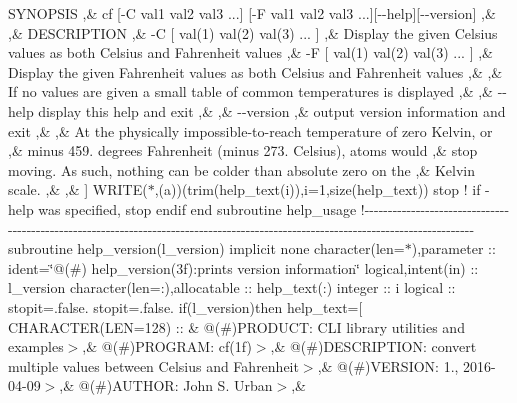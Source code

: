 \begin{DoxyCompactItemize}
\textquotesingle{}\+S\+Y\+N\+O\+P\+S\+I\+S \textquotesingle{},\& \textquotesingle{} cf \mbox{[}-\/\+C val1 val2 val3 ...\mbox{]} \mbox{[}-\/\+F val1 val2 val3 ...\mbox{]}\mbox{[}-\/-\/help\mbox{]}\mbox{[}-\/-\/version\mbox{]} \textquotesingle{},\& \textquotesingle{} \textquotesingle{},\& \textquotesingle{}\+D\+E\+S\+C\+R\+I\+P\+T\+I\+O\+N \textquotesingle{},\& \textquotesingle{} -\/\+C \mbox{[} val(1) val(2) val(3) ... \mbox{]} \textquotesingle{},\& \textquotesingle{} Display the given Celsius values as both Celsius and Fahrenheit values \textquotesingle{},\& \textquotesingle{} -\/\+F \mbox{[} val(1) val(2) val(3) ... \mbox{]} \textquotesingle{},\& \textquotesingle{} Display the given Fahrenheit values as both Celsius and Fahrenheit values \textquotesingle{},\& \textquotesingle{} \textquotesingle{},\& \textquotesingle{} If no values are given a small table of common temperatures is displayed \textquotesingle{},\& \textquotesingle{} \textquotesingle{},\& \textquotesingle{} -\/-\/help display this help and exit \textquotesingle{},\& \textquotesingle{} \textquotesingle{},\& \textquotesingle{} -\/-\/version \textquotesingle{},\& \textquotesingle{} output version information and exit \textquotesingle{},\& \textquotesingle{} \textquotesingle{},\& \textquotesingle{} At the physically impossible-\/to-\/reach temperature of zero Kelvin, or \textquotesingle{},\& \textquotesingle{} minus 459. degrees Fahrenheit (minus 273. Celsius), atoms would \textquotesingle{},\& \textquotesingle{} stop moving. As such, nothing can be colder than absolute zero on the \textquotesingle{},\& \textquotesingle{} Kelvin scale. \textquotesingle{},\& \textquotesingle{} \textquotesingle{},\& \textquotesingle{}\textquotesingle{}\mbox{]} W\+R\+I\+T\+E($\ast$,\textquotesingle{}(a)\textquotesingle{})(trim(help\+\_\+text(i)),i=1,size(help\+\_\+text)) stop ! if -\/help was specified, stop endif end subroutine help\+\_\+usage !-\/-\/-\/-\/-\/-\/-\/-\/-\/-\/-\/-\/-\/-\/-\/-\/-\/-\/-\/-\/-\/-\/-\/-\/-\/-\/-\/-\/-\/-\/-\/-\/-\/-\/-\/-\/-\/-\/-\/-\/-\/-\/-\/-\/-\/-\/-\/-\/-\/-\/-\/-\/-\/-\/-\/-\/-\/-\/-\/-\/-\/-\/-\/-\/-\/-\/-\/-\/-\/-\/-\/-\/-\/-\/-\/-\/-\/-\/-\/-\/-\/-\/-\/-\/-\/-\/-\/-\/-\/-\/-\/-\/-\/-\/-\/-\/-\/-\/-\/-\/-\/-\/-\/-\/-\/-\/-\/-\/-\/-\/-\/-\/-\/-\/-\/-\/-\/-\/-\/-\/-\/-\/-\/-\/-\/-\/-\/-\/-\/-\/-\/ subroutine help\+\_\+version(l\+\_\+version) implicit none character(len=$\ast$),parameter \+:: ident=\char`\"{}@(\#) help\+\_\+version(3f)\+:prints version information\char`\"{} logical,intent(in) \+:: l\+\_\+version character(len=\+:),allocatable \+:: help\+\_\+text(\+:) integer \+:: i logical \+:: stopit=.\+false. stopit=.\+false. if(l\+\_\+version)then help\+\_\+text=\mbox{[} C\+H\+A\+R\+A\+C\+T\+E\+R(\+L\+E\+N=128) \+:: \& \textquotesingle{}@(\#)\+P\+R\+O\+D\+U\+C\+T\+: C\+L\+I library utilities and examples$>$\textquotesingle{},\& \textquotesingle{}@(\#)\+P\+R\+O\+G\+R\+A\+M\+: cf(1f)$>$\textquotesingle{},\& \textquotesingle{}@(\#)\+D\+E\+S\+C\+R\+I\+P\+T\+I\+O\+N\+: convert multiple values between Celsius and Fahrenheit$>$\textquotesingle{},\& \textquotesingle{}@(\#)\+V\+E\+R\+S\+I\+O\+N\+: 1., 2016-\/04-\/09$>$\textquotesingle{},\& \textquotesingle{}@(\#)\+A\+U\+T\+H\+O\+R\+: John S. Urban$>$\textquotesingle{},\& 
\end{DoxyCompactItemize}
